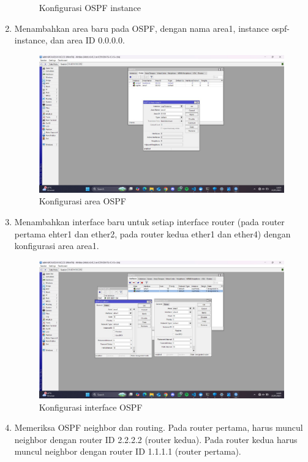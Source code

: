 \begin{enumerate}
\begin{figure}[H]
\begin{subfigure}[b]{0.4\linewidth}
		\end{subfigure}
		\caption{Konfigurasi OSPF instance}
		\hspace{1cm}
	\end{figure}
	\item Menambahkan area baru pada OSPF, dengan nama area1, instance ospf-instance, dan area ID 0.0.0.0.
	\begin{figure}[H]
		\centering
			\includegraphics[width=\linewidth]{P2/img/router 1 laptop 1 (13).jpg}
		\caption{Konfigurasi area OSPF}
		\hspace{1cm}
	\end{figure}
	\item Menambahkan interface baru untuk setiap interface router (pada router pertama ehter1 dan ether2, pada router kedua ether1 dan ether4) dengan konfigurasi area area1.
	\begin{figure}[H]
			\centering
			\includegraphics[width=\linewidth]{P2/img/router 1 laptop 1 (10).jpg}
		\caption{Konfigurasi interface OSPF}
		\hspace{1cm}
	\end{figure}
	\item Memeriksa OSPF neighbor dan routing. Pada router pertama, harus muncul neighbor dengan router ID 2.2.2.2 (router kedua). Pada router kedua harus muncul neighbor dengan router ID 1.1.1.1 (router pertama).

\end{enumerate}
